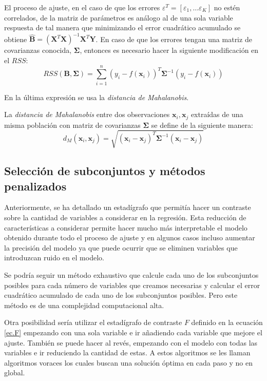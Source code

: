 \noindent El proceso de ajuste, en el caso de que los errores $\varepsilon^T=[\varepsilon_1,\ldots \varepsilon_K]$ no estén correlados, de la matriz de parámetros es análogo al de una sola variable respuesta de tal manera que minimizando el error cuadrático acumulado se obtiene $\hat{\textbf{B}}=(\textbf{X}^T\textbf{X})^{-1}\textbf{X}^T\textbf{Y}$. En caso de que los errores tengan una matriz de covarianzas conocida, $\mathbf{\Sigma}$, entonces es necesario hacer la siguiente modificación en el $RSS$:
\begin{equation}
RSS(\textbf{B},\mathbf{\Sigma})=\sum_{i=1}^n(y_i-f(\textbf{x}_i))^T \mathbf{\Sigma}^{-1} (y_i-f(\textbf{x}_i))
\end{equation}

\noindent En la última expresión se usa la \textit{distancia de Mahalanobis}.
\begin{defi}\label{Mahalanobis}
La \textit{distancia de Mahalanobis} entre dos observaciones $\textbf{x}_i, \textbf{x}_j$ extraídas de una misma población con matriz de covarianzas $\mathbf{\Sigma}$ se define de la siguiente manera\cite{Cuadras 2014}: 
\begin{equation}
d_M(\textbf{x}_i, \textbf{x}_j)=\sqrt{(\textbf{x}_i- \textbf{x}_j)^T \mathbf{\Sigma}^{-1}(\textbf{x}_i-\textbf{x}_j)}
\end{equation}
\end{defi}

\subsection*{Selección de subconjuntos y métodos penalizados}

\noindent Anteriormente, se ha detallado un estadígrafo que permitía hacer un contraste sobre la cantidad de variables a considerar en la regresión. 
Esta reducción de características a considerar permite hacer mucho más interpretable el modelo obtenido durante todo el proceso de ajuste y en algunos casos incluso aumentar la precisión del modelo ya que puede ocurrir que se eliminen variables que introduzcan ruido en el modelo. 

\noindent Se podría seguir un método exhaustivo que calcule cada uno de los subconjuntos posibles para cada número de variables que creamos necesarias y calcular el error cuadrático acumulado de cada uno de los subconjuntos posibles. Pero este método es de una complejidad computacional alta. 

\noindent Otra posibilidad sería utilizar el estadígrafo de contraste $F$ definido en la ecuación \eqref{ec.F} empezando con una sola variable e ir añadiendo cada variable que mejore el ajuste. También se puede hacer al revés, empezando con el modelo con todas las variables e ir reduciendo la cantidad de estas. A estos algoritmos se les llaman algoritmos voraces los cuales buscan una solución óptima en cada paso y no en global. 

